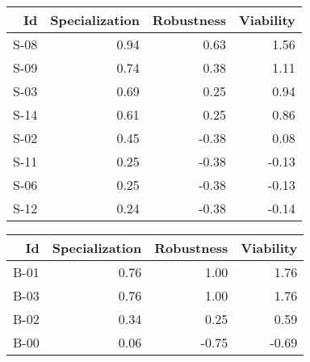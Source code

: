 


\begin{tabular}{ | r | r | r | r | }
    \hline
                    Id  &  Specialization  &      Robustness  &       Viability  \\
    \hline
    \hline
                  S-08  &            0.94  &            0.63  &            1.56  \\
    \hline
                  S-09  &            0.74  &            0.38  &            1.11  \\
    \hline
                  S-03  &            0.69  &            0.25  &            0.94  \\
    \hline
                  S-14  &            0.61  &            0.25  &            0.86  \\
    \hline
                  S-02  &            0.45  &           -0.38  &            0.08  \\
    \hline
                  S-11  &            0.25  &           -0.38  &           -0.13  \\
    \hline
                  S-06  &            0.25  &           -0.38  &           -0.13  \\
    \hline
                  S-12  &            0.24  &           -0.38  &           -0.14  \\
    \hline
\end{tabular}


\begin{tabular}{ | r | r | r | r | }
    \hline
                    Id  &  Specialization  &      Robustness  &       Viability  \\
    \hline
    \hline
                  B-01  &            0.76  &            1.00  &            1.76  \\
    \hline
                  B-03  &            0.76  &            1.00  &            1.76  \\
    \hline
                  B-02  &            0.34  &            0.25  &            0.59  \\
    \hline
                  B-00  &            0.06  &           -0.75  &           -0.69  \\
    \hline
\end{tabular}


